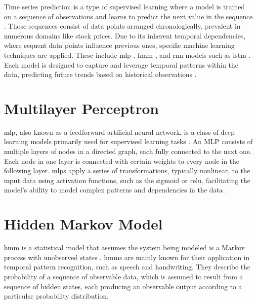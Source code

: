 Time series prediction is a type of supervised learning where a model is trained on a sequence of observations and learns to predict the next value in the sequence \cite{brownleeDeepLearningTime}.
Those sequences consist of data points arranged chronologically, prevalent in numerous domains like stock prices.
Due to its inherent temporal dependencies, where sequent data points influence previous ones, specific machine learning techniques are applied.
These include \ac{mlp} \cite{mlp-backpropagation-rumelhart}, \ac{hmm} \cite{hmm-rabiner-1989}, and \ac{rnn} \cite{hopfield-rnn} models such as \ac{lstm} \cite{lstm-hochreiter}.
Each model is designed to capture and leverage temporal patterns within the data, predicting future trends based on historical observations \cite{neptune-ai}.



\section{Multilayer Perceptron}

\ac{mlp}, also known as a feedforward artificial neural network, is a class of deep learning models primarily used for supervised learning tasks \cite{mlp-backpropagation-rumelhart}.
An MLP consists of multiple layers of nodes in a directed graph, each fully connected to the next one.
Each node in one layer is connected with certain weights to every node in the following layer.
\acp{mlp} apply a series of transformations, typically nonlinear, to the input data using activation functions, such as the sigmoid or \ac{relu}, facilitating the model's ability to model complex patterns and dependencies in the data \cite{goodfellow_deep_2016}.

\section{Hidden Markov Model}

\ac{hmm} is a statistical model that assumes the system being modeled is a Markov process with unobserved states \cite{hmm-rabiner-1989}.
\acp{hmm} are mainly known for their application in temporal pattern recognition, such as speech and handwriting.
They describe the probability of a sequence of observable data, which is assumed to result from a sequence of hidden states, each producing an observable output according to a particular probability distribution.

